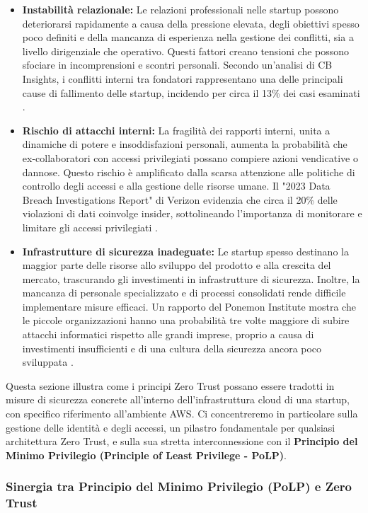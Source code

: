 \begin{itemize}
  \item \textbf{Instabilità relazionale:} Le relazioni professionali nelle startup possono deteriorarsi rapidamente a causa della pressione elevata, degli obiettivi spesso poco definiti e della mancanza di esperienza nella gestione dei conflitti, sia a livello dirigenziale che operativo. Questi fattori creano tensioni che possono sfociare in incomprensioni e scontri personali. Secondo un'analisi di CB Insights, i conflitti interni tra fondatori rappresentano una delle principali cause di fallimento delle startup, incidendo per circa il 13\% dei casi esaminati \cite{CBInsights2023}.
  \item \textbf{Rischio di attacchi interni:} La fragilità dei rapporti interni, unita a dinamiche di potere e insoddisfazioni personali, aumenta la probabilità che ex-collaboratori con accessi privilegiati possano compiere azioni vendicative o dannose. Questo rischio è amplificato dalla scarsa attenzione alle politiche di controllo degli accessi e alla gestione delle risorse umane. Il "2023 Data Breach Investigations Report" di Verizon evidenzia che circa il 20\% delle violazioni di dati coinvolge insider, sottolineando l’importanza di monitorare e limitare gli accessi privilegiati \cite{Verizon2023}.
  \item \textbf{Infrastrutture di sicurezza inadeguate:} Le startup spesso destinano la maggior parte delle risorse allo sviluppo del prodotto e alla crescita del mercato, trascurando gli investimenti in infrastrutture di sicurezza. Inoltre, la mancanza di personale specializzato e di processi consolidati rende difficile implementare misure efficaci. Un rapporto del Ponemon Institute mostra che le piccole organizzazioni hanno una probabilità tre volte maggiore di subire attacchi informatici rispetto alle grandi imprese, proprio a causa di investimenti insufficienti e di una cultura della sicurezza ancora poco sviluppata \cite{Ponemon2023}.
\end{itemize}
Questa sezione illustra come i principi Zero Trust possano essere tradotti in misure di sicurezza concrete all'interno dell'infrastruttura cloud di una startup, con specifico riferimento all'ambiente AWS. Ci concentreremo in particolare sulla gestione delle identità e degli accessi, un pilastro fondamentale per qualsiasi architettura Zero Trust, e sulla sua stretta interconnessione con il \textbf{Principio del Minimo Privilegio (Principle of Least Privilege - PoLP)}.
\subsubsection{Sinergia tra Principio del Minimo Privilegio (PoLP) e Zero Trust}
\label{subsubsec:polp-zerotrust-correlation}

